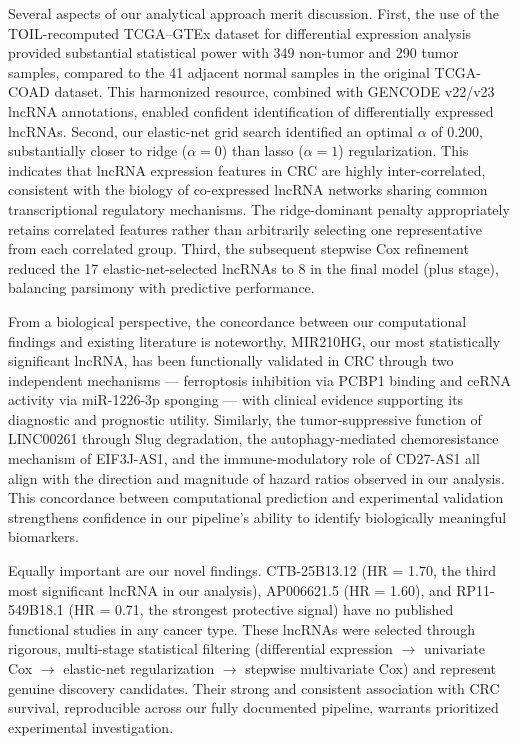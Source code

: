 \documentclass[fleqn,10pt]{wlscirep}
\begin{document}
Several aspects of our analytical approach merit discussion. First, the use of the TOIL-recomputed TCGA--GTEx dataset for differential expression analysis provided substantial statistical power with 349 non-tumor and 290 tumor samples, compared to the 41 adjacent normal samples in the original TCGA-COAD dataset. This harmonized resource, combined with GENCODE v22/v23 lncRNA annotations, enabled confident identification of differentially expressed lncRNAs. Second, our elastic-net grid search identified an optimal $\alpha$ of 0.200, substantially closer to ridge ($\alpha = 0$) than lasso ($\alpha = 1$) regularization. This indicates that lncRNA expression features in CRC are highly inter-correlated, consistent with the biology of co-expressed lncRNA networks sharing common transcriptional regulatory mechanisms. The ridge-dominant penalty appropriately retains correlated features rather than arbitrarily selecting one representative from each correlated group. Third, the subsequent stepwise Cox refinement reduced the 17 elastic-net-selected lncRNAs to 8 in the final model (plus stage), balancing parsimony with predictive performance.

From a biological perspective, the concordance between our computational findings and existing literature is noteworthy. MIR210HG, our most statistically significant lncRNA, has been functionally validated in CRC through two independent mechanisms --- ferroptosis inhibition via PCBP1 binding and ceRNA activity via miR-1226-3p sponging --- with clinical evidence supporting its diagnostic and prognostic utility. Similarly, the tumor-suppressive function of LINC00261 through Slug degradation, the autophagy-mediated chemoresistance mechanism of EIF3J-AS1, and the immune-modulatory role of CD27-AS1 all align with the direction and magnitude of hazard ratios observed in our analysis. This concordance between computational prediction and experimental validation strengthens confidence in our pipeline's ability to identify biologically meaningful biomarkers.

Equally important are our novel findings. CTB-25B13.12 (HR = 1.70, the third most significant lncRNA in our analysis), AP006621.5 (HR = 1.60), and RP11-549B18.1 (HR = 0.71, the strongest protective signal) have no published functional studies in any cancer type. These lncRNAs were selected through rigorous, multi-stage statistical filtering (differential expression $\rightarrow$ univariate Cox $\rightarrow$ elastic-net regularization $\rightarrow$ stepwise multivariate Cox) and represent genuine discovery candidates. Their strong and consistent association with CRC survival, reproducible across our fully documented pipeline, warrants prioritized experimental investigation.
\end{document}
